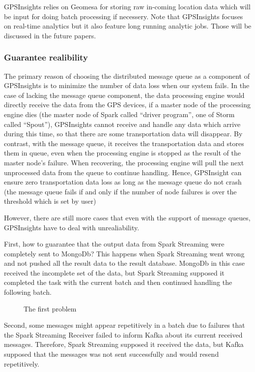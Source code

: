 \documentclass{acm_proc_article-sp}
\begin{document}
GPSInsights relies on Geomesa for storing raw in-coming location data which will be input for doing batch processing if necessery. Note that GPSInsights focuses on real-time analytics but it also feature long running analytic jobs. Those will be discussed in the future papers. 

\subsubsection{Guarantee realibility}

The primary reason of choosing the distributed message queue as a component of GPSInsights is to minimize the number of data loss when our system fails. In the case of lacking the message queue component, the data processing engine would directly receive the data from the GPS devices, if a master node of the processing engine dies (the master node of Spark called ``driver program'', one of Storm called ``Spout''), GPSInsights cannot receive and handle any data which arrive during this time, so that there are some transportation data will disappear. By contrast, with the message queue, it receives the transportation data and stores them in queue, even when the processing engine is stopped as the result of the master node's failure. When recovering, the processing engine will pull the next unprocessed data from the queue to continue handling. Hence, GPSInsight can ensure zero transportation data loss as long as the message queue do not crash (the message queue fails if and only if the number of node failures is over the threshold which is set by user)

However, there are still more cases that even with the support of message queues, GPSInsights have to deal with unrealiability. 

First, how to guarantee that the output data from Spark Streaming were completely sent to MongoDb? This happens when Spark Streaming went wrong and not pushed all the result data to the result database. MongoDb in this case received the incomplete set of the data, but Spark Streaming supposed it completed the task with the current batch and then continued handling the following batch.

\begin{figure}[h]
\centering
{}
\caption{The first problem}
\end{figure} 

Second, some messages might appear repetitively in a batch due to failures that the Spark Streaming Receiver failed to inform Kafka about its current received messages. Therefore, Spark Streaming supposed it received the data, but Kafka supposed that the messages was not sent successfully and would resend repetitively. 
 
\end{document}
